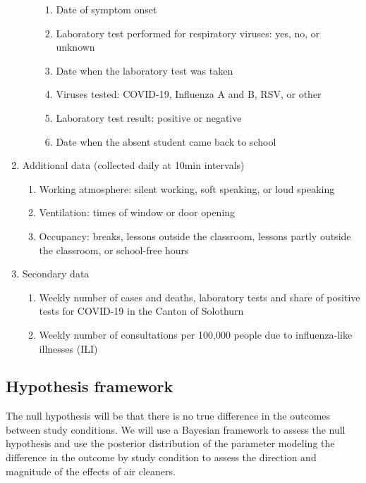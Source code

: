 \documentclass{article}
\begin{document}
\begin{enumerate}
\begin{enumerate}
\begin{enumerate}
            \item Date of symptom onset
            \item Laboratory test performed for respiratory viruses: yes, no, or unknown
            \item Date when the laboratory test was taken
            \item Viruses tested: COVID-19, Influenza A and B, RSV, or other
            \item Laboratory test result: positive or negative
            \item Date when the absent student came back to school
        \end{enumerate}
    \end{enumerate}
    \item Additional data (collected daily at 10min intervals)
    \begin{enumerate}
        \item Working atmosphere: silent working, soft speaking, or loud speaking 
        \item Ventilation: times of window or door opening
        \item Occupancy: breaks, lessons outside the classroom, lessons partly outside the classroom, or school-free hours
    \end{enumerate}
    \item Secondary data
    \begin{enumerate}
        \item Weekly number of cases and deaths, laboratory tests and share of positive tests for COVID-19 in the Canton of Solothurn \cite{FOPH2023Cases}
        \item Weekly number of consultations per 100,000 people due to influenza-like illnesses (ILI) \cite{FOPH2023Consultations}
    \end{enumerate}
\end{enumerate}

\subsection{Hypothesis framework}

The null hypothesis will be that there is no true difference in the outcomes between study conditions. We will use a Bayesian framework to assess the null hypothesis and use the posterior distribution of the parameter modeling the difference in the outcome by study condition to assess the direction and magnitude of the effects of air cleaners. 
\end{document}
